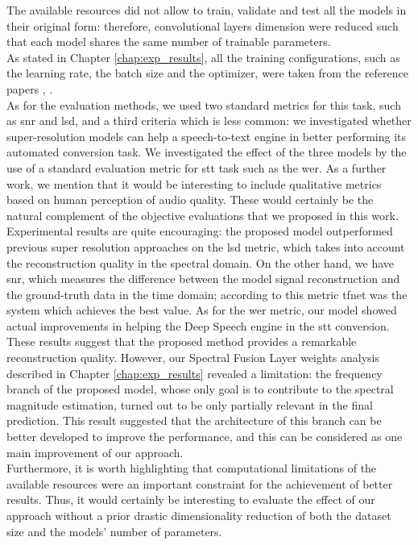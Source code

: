 The available resources did not allow to train, validate and test all the models in their original form: therefore, convolutional layers dimension were reduced such that each model shares the same number of trainable parameters. \\
As stated in Chapter \ref{chap:exp_results}, all the training configurations, such as the learning rate, the batch size and the optimizer, were taken from the reference papers \cite{lim2018time}, \cite{birnbaum2019temporal}. \\
As for the evaluation methods, we used two standard metrics for this task, such as \gls{snr} and \gls{lsd}, and a third criteria which is less common: we investigated whether super-resolution models can help a speech-to-text engine in better performing its automated conversion task. We investigated the effect of the three models by the use of a standard evaluation metric for \gls{stt} task such as the \gls{wer}. As a further work, we mention that it would be interesting to include qualitative metrics based on human perception of audio quality. These would certainly be the natural complement of the objective evaluations that we proposed in this work. \\
Experimental results are quite encouraging: the proposed model outperformed previous super resolution approaches on the \gls{lsd} metric, which takes into account the reconstruction quality in the spectral domain. On the other hand, we have \gls{snr}, which measures the difference between the model signal reconstruction and the ground-truth data in the time domain; according to this metric \gls{tfnet} was the system which achieves the best value. As for the \gls{wer} metric, our model showed actual improvements in helping the Deep Speech engine in the \gls{stt} conversion. \\
These results suggest that the proposed method provides a remarkable reconstruction quality. However, our Spectral Fusion Layer weights analysis described in Chapter \ref{chap:exp_results} revealed a limitation: the frequency branch of the proposed model, whose only goal is to contribute to the spectral magnitude estimation, turned out to be only partially relevant in the final prediction. This result suggested that the architecture of this branch can be better developed to improve the performance, and this can be considered as one main improvement of our approach.\\
Furthermore, it is worth highlighting that computational limitations of the available resources were an important constraint for the achievement of better results. Thus, it would certainly be interesting to evaluate the effect of our approach without a prior drastic dimensionality reduction of both the dataset size and the models' number of parameters. \\